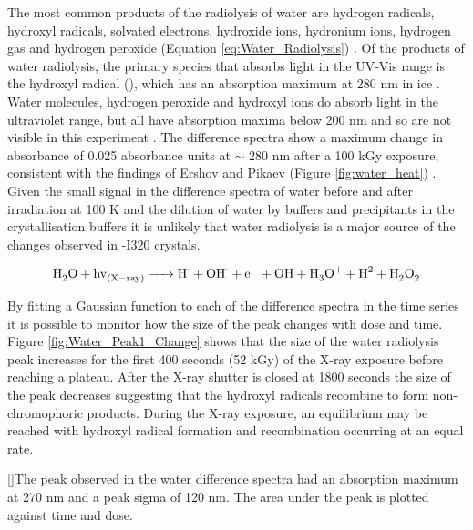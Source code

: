 The most common products of the radiolysis of water are hydrogen radicals, hydroxyl radicals, solvated electrons, hydroxide ions, hydronium ions, hydrogen gas and hydrogen peroxide (Equation \ref{eq:Water_Radiolysis}) \cite{LeCaer2011}. Of the products of water radiolysis, the primary species that absorbs light in the UV-Vis range is the hydroxyl radical (), which has an absorption maximum at 280 \si{\nano\meter} in ice \cite{Ershov1968}. Water molecules, hydrogen peroxide and hydroxyl ions do absorb light in the ultraviolet range, but all have absorption maxima below 200 \si{\nano\meter} and so are not visible in this experiment \cite{Pagsberg1969,Czapski1993}. The difference spectra show a maximum change in absorbance of 0.025 absorbance units at $\sim$ 280 \si{\nano\meter} after a 100 kGy exposure, consistent with the findings of Ershov and Pikaev (Figure \ref{fig:water_heat}) \cite{Ershov1968}. Given the small signal in the difference spectra of water before and after irradiation at 100 K and the dilution of water by buffers and precipitants in the crystallisation buffers it is unlikely that water radiolysis is a major source of the changes observed in \atpdx -I320 crystals. 

\begin{equation}
\ce{H2O + hv_{(X-ray)} -> H^{.} + OH^{.} + e^- + OH^ + H3O^+ + H^2 + H2O2}\label{eq:Water_Radiolysis}
\end{equation}

By fitting a Gaussian function to each of the difference spectra in the time series it is possible to monitor how the size of the peak changes with dose and time. Figure \ref{fig:Water_Peak1_Change} shows that the size of the water radiolysis peak increases for the first 400 seconds (52 kGy) of the X-ray exposure before reaching a plateau. After the X-ray shutter is closed at 1800 seconds the size of the peak decreases suggesting that the hydroxyl radicals recombine to form non-chromophoric products. During the X-ray exposure, an equilibrium may be reached with hydroxyl radical formation and recombination occurring at an equal rate.   

\begin{minipage}{\linewidth}
	[]{The peak observed in the water difference spectra had an absorption maximum at 270 nm and a peak sigma of 120 nm. The area under the peak is plotted against time and dose.\label{fig:Water_Peak1_Change}}	
\end{minipage} 
\newpage
\clearpage
